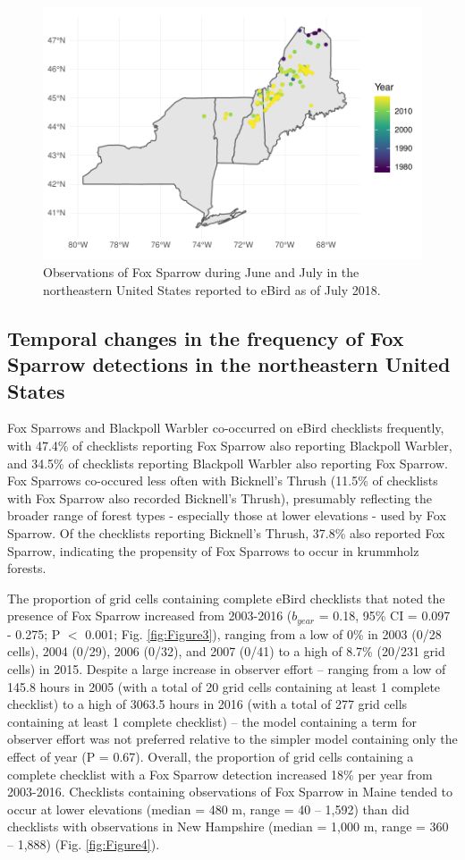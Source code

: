 \documentclass[fleqn,10pt,lineno]{wlpeerj} %
\begin{document}
\begin{figure}[ht]\centering
\includegraphics[width=\linewidth]{Figure2}
\caption{Observations of Fox Sparrow during June and July in the northeastern United States reported to eBird as of July 2018.}
\label{fig:Figure2}
\end{figure}

\subsection*{Temporal changes in the frequency of Fox Sparrow detections in the northeastern United States}
Fox Sparrows and Blackpoll Warbler co-occurred on eBird checklists frequently, with 47.4\% of checklists reporting Fox Sparrow also reporting Blackpoll Warbler, and 34.5\% of checklists reporting Blackpoll Warbler also reporting Fox Sparrow. Fox Sparrows co-occured less often with Bicknell's Thrush (11.5\% of checklists with Fox Sparrow also recorded Bicknell's Thrush), presumably reflecting the broader range of forest types - especially those at lower elevations - used by Fox Sparrow. Of the checklists reporting Bicknell's Thrush, 37.8\% also reported Fox Sparrow, indicating the propensity of Fox Sparrows to occur in krummholz forests. 

The proportion of grid cells containing complete eBird checklists that noted the presence of Fox Sparrow increased from 2003-2016 ($b_{year}$ = 0.18, 95\% CI = 0.097 - 0.275; P $<$ 0.001; Fig. \ref{fig:Figure3}), ranging from a low of 0\% in 2003 (0/28 cells), 2004 (0/29), 2006 (0/32), and 2007 (0/41) to a high of 8.7\% (20/231 grid cells) in 2015. Despite a large increase in observer effort – ranging from a low of 145.8 hours in 2005 (with a total of 20 grid cells containing at least 1 complete checklist) to a high of 3063.5 hours in 2016 (with a total of 277 grid cells containing at least 1 complete checklist) – the model containing a term for observer effort was not preferred relative to the simpler model containing only the effect of year (P = 0.67). Overall, the proportion of grid cells containing a complete checklist with a Fox Sparrow detection increased 18\% per year from 2003-2016. Checklists containing observations of Fox Sparrow in Maine tended to occur at lower elevations (median = 480 m, range = 40 – 1,592) than did checklists with observations in New Hampshire (median = 1,000 m, range = 360 – 1,888) (Fig. \ref{fig:Figure4}). 
\end{document}
